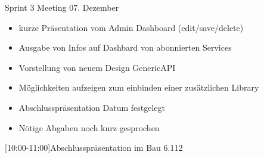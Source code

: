 \begin{Protokoll}{Sprint 3 Meeting 07. Dezember}
\protokollKopf

\begin{itemize}
  \item kurze Präsentation vom Admin Dashboard (edit/save/delete)
  \item Ausgabe von Infos auf Dashbard von abonnierten Services
\end{itemize}

\begin{itemize}
  \item Vorstellung von neuem Design GenericAPI
  \item Möglichkeiten aufzeigen zum einbinden einer zusätzlichen Library
\end{itemize}

\begin{itemize}
  \item Abschlusspräsentation Datum festgelegt
  \item Nötige Abgaben noch kurz gesprochen
\end{itemize}


[10:00-11:00]{Abschlusspräsentation im Bau 6.112}


\end{Protokoll}

